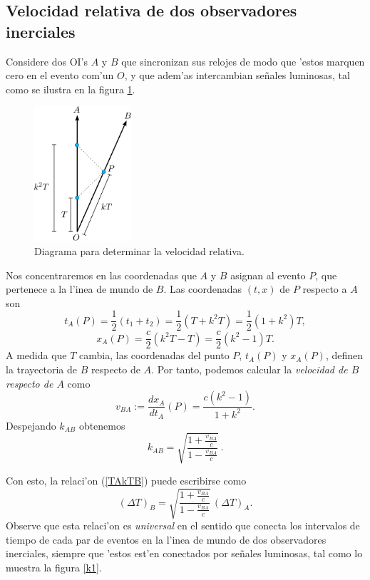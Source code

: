 \subsection{Velocidad relativa de dos observadores inerciales}

Considere dos OI's $A$ y $B$ que sincronizan sus relojes de
modo que 'estos marquen cero en el evento com'un $O$, y que adem'as intercambian se\~nales luminosas, tal como se ilustra en la figura \ref{fig:k2}.
\begin{figure}[H]
\centerline{\includegraphics[height=5cm]{fig/fig-diagrama-velocidad-relativa.pdf}}
 \caption{Diagrama para determinar la velocidad relativa.}
\label{fig:k2}
\end{figure}
Nos concentraremos en las coordenadas que $A$ y $B$ asignan al evento $P$, que  pertenece a la l'inea de mundo de $B$. Las coordenadas $(t,x)$ de $P$
respecto a $A$ son
\begin{equation}
t_A(P)=\frac{1}{2}(t_1+t_2)=\frac{1}{2}(T + k^2T)=\frac{1}{2}(1+k^2)T,
\end{equation}
\begin{equation}
x_A(P)=\frac{c}{2}(k^2T-T)=\frac{c}{2}(k^2-1)T.
\end{equation}
A medida que $T$ cambia, las coordenadas del punto $P$, $t_A(P)$ y $x_A(P)$, definen la trayectoria de $B$ respecto de $A$. Por tanto, podemos calcular la \textit{velocidad de $B$ respecto de $A$} como
\begin{equation}
v_{BA}:=\frac{dx_A}{dt_A}(P)=\frac{c(k^2-1)}{1+k^2}.
\end{equation}
Despejando $k_{AB}$ obtenemos
\begin{equation}
k_{AB}=\sqrt{\frac{1+\frac{v_{BA}}{c}}{1-\frac{v_{BA}}{c}}} \,.\label{k}
\end{equation}

Con esto, la relaci'on (\ref{TAkTB}) puede escribirse como
\begin{equation}
(\Delta T)_B=\sqrt{\frac{1+\frac{v_{BA}}{c}}{1-\frac{v_{BA}}{c}}}
\,(\Delta T)_A. \label{k2}
\end{equation}
Observe que esta relaci'on es \textit{universal} en el sentido que conecta los intervalos de tiempo de cada par de eventos en la l'inea de mundo de dos observadores inerciales, siempre que 'estos est'en conectados por se\~nales luminosas, tal como lo muestra la figura \ref{k1}.

